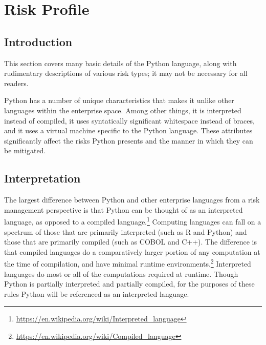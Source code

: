\section{Risk Profile}

\thispagestyle{section_start_style}

	\subsection{Introduction}

		\begin{tcolorbox}
			This section covers many basic details of the Python language, along with rudimentary descriptions of various risk types; it may not be necessary for all readers.
		\end{tcolorbox}

		Python has a number of unique characteristics that makes it unlike other languages within the enterprise space. Among other things, it is interpreted instead of compiled, it uses syntatically significant whitespace instead of braces, and it uses a virtual machine specific to the Python language. These attributes significantly affect the risks Python presents and the manner in which they can be mitigated.

	\subsection{Interpretation}

		The largest difference between Python and other enterprise languages from a risk management perspective is that Python can be thought of as an interpreted language, as opposed to a compiled language.\footnote{\url{https://en.wikipedia.org/wiki/Interpreted_language}} Computing languages can fall on a spectrum of those that are primarily interpreted (such as R and Python) and those that are primarily compiled (such as COBOL and C++). The difference is that compiled languages do a comparatively larger portion of any computation at the time of compilation, and have minimal runtime environments.\footnote{\url{https://en.wikipedia.org/wiki/Compiled_language}} Interpreted languages do most or all of the computations required at runtime. Though Python is partially interpreted and partially compiled, for the purposes of these rules Python will be referenced as an interpreted language.

